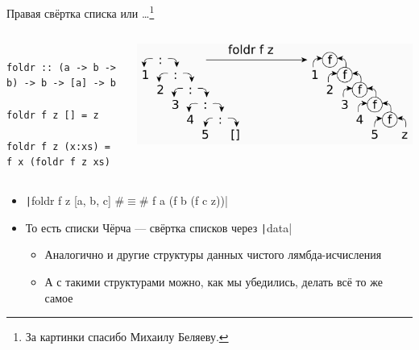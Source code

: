     \begin{frame}[fragile]{Правая свёртка списка или \ldots\footnote{За картинки спасибо Михаилу Беляеву.}}
        \vspace{-1em}
        \begin{columns}[onlytextwidth]
            \begin{column}{0.485\textwidth}
                \begin{verbatim}
                    foldr :: (a -> b -> b) -> b -> [a] -> b
                    foldr f z [] = z
                    foldr f z (x:xs) = f x (foldr f z xs)
                \end{verbatim}
            \end{column}\hfill%
            \begin{column}{0.5\textwidth}
                \begin{center}
                    \includegraphics[width=1\textwidth]{figs/foldr}
                \end{center}
            \end{column}
        \end{columns}
        \vspace{0.5em}
        \begin{itemize}
            \item \texttt|foldr f z [a, b, c] #$\equiv$# f a (f b (f c z))|
            \item[\then] То есть списки Чёрча --- свёртка списков через \texttt|data|
            \begin{itemize}
                \item Аналогично и другие структуры данных чистого лямбда-исчисления
                \item А с такими структурами можно, как мы убедились, делать всё то же самое
            \end{itemize}
        \end{itemize}
    \end{frame}

